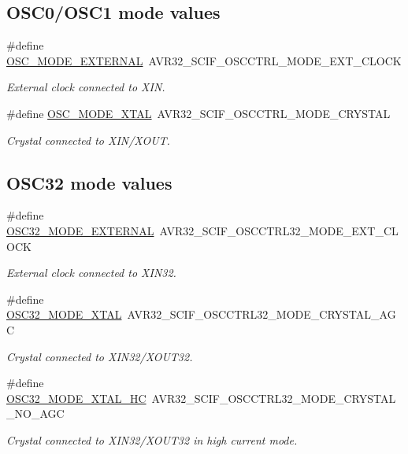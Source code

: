 \subsection*{\-O\-S\-C0/\-O\-S\-C1 mode values}
\begin{DoxyCompactItemize}
\item 
\#define \hyperlink{group__osc__group_ga2af36f82400248c817d3cea5dce7df4a}{\-O\-S\-C\-\_\-\-M\-O\-D\-E\-\_\-\-E\-X\-T\-E\-R\-N\-A\-L}~\-A\-V\-R32\-\_\-\-S\-C\-I\-F\-\_\-\-O\-S\-C\-C\-T\-R\-L\-\_\-\-M\-O\-D\-E\-\_\-\-E\-X\-T\-\_\-\-C\-L\-O\-C\-K
\begin{DoxyCompactList}\small\item\em \-External clock connected to \-X\-I\-N. \end{DoxyCompactList}\item 
\#define \hyperlink{group__osc__group_gad2ef78eeb228f299c355ecdb76bcfc2a}{\-O\-S\-C\-\_\-\-M\-O\-D\-E\-\_\-\-X\-T\-A\-L}~\-A\-V\-R32\-\_\-\-S\-C\-I\-F\-\_\-\-O\-S\-C\-C\-T\-R\-L\-\_\-\-M\-O\-D\-E\-\_\-\-C\-R\-Y\-S\-T\-A\-L
\begin{DoxyCompactList}\small\item\em \-Crystal connected to \-X\-I\-N/\-X\-O\-U\-T. \end{DoxyCompactList}\end{DoxyCompactItemize}
\subsection*{\-O\-S\-C32 mode values}
\begin{DoxyCompactItemize}
\item 
\#define \hyperlink{group__osc__group_ga74f67f937d9bc13762fc32c5eca7c196}{\-O\-S\-C32\-\_\-\-M\-O\-D\-E\-\_\-\-E\-X\-T\-E\-R\-N\-A\-L}~\-A\-V\-R32\-\_\-\-S\-C\-I\-F\-\_\-\-O\-S\-C\-C\-T\-R\-L32\-\_\-\-M\-O\-D\-E\-\_\-\-E\-X\-T\-\_\-\-C\-L\-O\-C\-K
\begin{DoxyCompactList}\small\item\em \-External clock connected to \-X\-I\-N32. \end{DoxyCompactList}\item 
\#define \hyperlink{group__osc__group_ga10cea55d2d2b9425cec52633b443adfd}{\-O\-S\-C32\-\_\-\-M\-O\-D\-E\-\_\-\-X\-T\-A\-L}~\-A\-V\-R32\-\_\-\-S\-C\-I\-F\-\_\-\-O\-S\-C\-C\-T\-R\-L32\-\_\-\-M\-O\-D\-E\-\_\-\-C\-R\-Y\-S\-T\-A\-L\-\_\-\-A\-G\-C
\begin{DoxyCompactList}\small\item\em \-Crystal connected to \-X\-I\-N32/\-X\-O\-U\-T32. \end{DoxyCompactList}\item 
\#define \hyperlink{group__osc__group_ga5633c2bfa1bd7f1122b9e9eaf00c3ac8}{\-O\-S\-C32\-\_\-\-M\-O\-D\-E\-\_\-\-X\-T\-A\-L\-\_\-\-H\-C}~\-A\-V\-R32\-\_\-\-S\-C\-I\-F\-\_\-\-O\-S\-C\-C\-T\-R\-L32\-\_\-\-M\-O\-D\-E\-\_\-\-C\-R\-Y\-S\-T\-A\-L\-\_\-\-N\-O\-\_\-\-A\-G\-C
\begin{DoxyCompactList}\small\item\em \-Crystal connected to \-X\-I\-N32/\-X\-O\-U\-T32 in high current mode. \end{DoxyCompactList}\end{DoxyCompactItemize}
